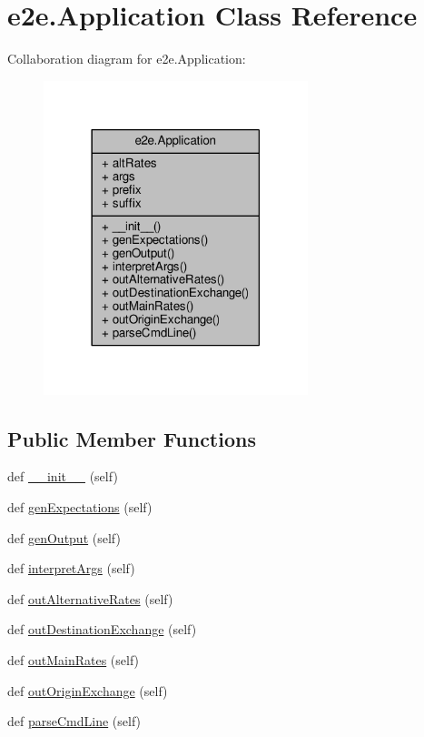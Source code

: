 \hypertarget{classe2e_1_1_application}{}\section{e2e.\+Application Class Reference}
\label{classe2e_1_1_application}


Collaboration diagram for e2e.\+Application\+:\nopagebreak
\begin{figure}[H]
\begin{center}
\leavevmode
\includegraphics[width=218pt]{classe2e_1_1_application__coll__graph}
\end{center}
\end{figure}
\subsection*{Public Member Functions}
\begin{DoxyCompactItemize}
\item 
def \hyperlink{classe2e_1_1_application_a2267bd2e8d3114095e6271aed7f8c8c9}{\+\_\+\+\_\+init\+\_\+\+\_\+} (self)
\item 
def \hyperlink{classe2e_1_1_application_a72b854da6d69dbcb5031f24dccf9cc71}{gen\+Expectations} (self)
\item 
def \hyperlink{classe2e_1_1_application_a0f753699fabab3ae17407b36404d3b64}{gen\+Output} (self)
\item 
def \hyperlink{classe2e_1_1_application_ae7b9559aa388f8178300fb4d7a9f9257}{interpret\+Args} (self)
\item 
def \hyperlink{classe2e_1_1_application_a95da0cb34726f10409806c6d052494fc}{out\+Alternative\+Rates} (self)
\item 
def \hyperlink{classe2e_1_1_application_a1b099bee6f8170c4c52e7ae884d95b27}{out\+Destination\+Exchange} (self)
\item 
def \hyperlink{classe2e_1_1_application_a3e33fd00d85637393d48ea3f7dbd95c7}{out\+Main\+Rates} (self)
\item 
def \hyperlink{classe2e_1_1_application_adfad90d64cddb8d751961202264ca489}{out\+Origin\+Exchange} (self)
\item 
def \hyperlink{classe2e_1_1_application_a91b8b6df6456d27bed503849ffcdcc77}{parse\+Cmd\+Line} (self)
\end{DoxyCompactItemize}
